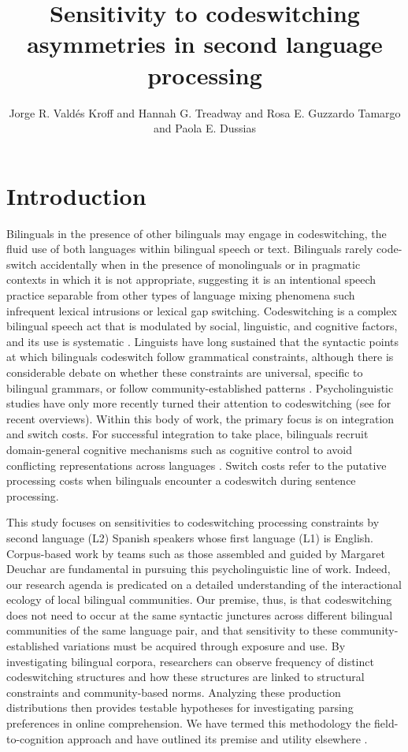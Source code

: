 \documentclass[output=paper,colorlinks,citecolor=brown]{langscibook}
\author{Jorge R. Valdés Kroff\orcid{0000-0002-3943-5496}\affiliation{University of Florida} and Hannah G. Treadway\orcid{0000-0001-6244-7674}\affiliation{University of Florida} and Rosa E. Guzzardo Tamargo\orcid{0000-0002-3074-8680}\affiliation{University of Puerto Rico at Río Piedras} and Paola E. Dussias\orcid{0000-0002-9481-7489}\affiliation{Pennsylvania State University}}
\title{Sensitivity to codeswitching asymmetries in second language processing}
\begin{document}
\maketitle


\section{Introduction}
Bilinguals in the presence of other bilinguals may engage in codeswitching, the fluid use of both languages within bilingual speech or text. Bilinguals rarely code-switch accidentally when in the presence of monolinguals or in pragmatic contexts in which it is not appropriate, suggesting it is an intentional speech practice separable from other types of language mixing phenomena such infrequent lexical intrusions \citep{Gollan2016} or lexical gap switching. Codeswitching is a complex bilingual speech act that is modulated by social, linguistic, and cognitive factors, and its use is systematic \citep{Deuchar2020,TorresCacoullosTravis2018}. Linguists have long sustained that the syntactic points at which bilinguals codeswitch follow grammatical constraints, although there is considerable debate on whether these constraints are universal, specific to bilingual grammars, or follow community-established patterns \citep{Deuchar2020,Licerasetal2008,Lopez2020,ParafitaCoutoGullberg2017,ParafitaCoutoetal2023}. Psycholinguistic studies have only more recently turned their attention to codeswitching (see \cite{ValdesKroffetal2023,VanHell2022} for recent overviews). Within this body of work, the primary focus is on integration and switch costs. For successful integration to take place, bilinguals recruit domain-general cognitive mechanisms such as cognitive control to avoid conflicting representations across languages \citep{ValdesKroffDussias2023}. Switch costs refer to the putative processing costs when bilinguals encounter a codeswitch during sentence processing.

This study focuses on sensitivities to codeswitching processing constraints by second language (L2) Spanish speakers whose first language (L1) is English. Corpus-based work by teams such as those assembled and guided by Margaret Deuchar \citep{Deucharetal2014} are fundamental in pursuing this psycholinguistic line of work. Indeed, our research agenda is predicated on a detailed understanding of the interactional ecology of local bilingual communities. Our premise, thus, is that codeswitching does not need to occur at the same syntactic junctures across different bilingual communities of the same language pair, and that sensitivity to these community-established variations must be acquired through exposure and use. By investigating bilingual corpora, researchers can observe frequency of distinct codeswitching structures and how these structures are linked to structural constraints and community-based norms. Analyzing these production distributions then provides testable hypotheses for investigating parsing preferences in online comprehension. We have termed this methodology the field-to-cognition approach and have outlined its premise and utility elsewhere \citep{BeattyMartinezetal2018,ValdesKroffetal2018}.
\end{document}
